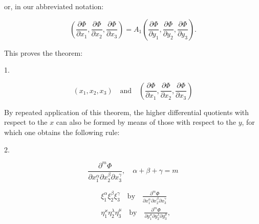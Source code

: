 or, in our abbreviated notation:

\[
\left(\frac{\partial \Phi}{\partial x_1}, \frac{\partial \Phi}{\partial x_2}, \frac{\partial \Phi}{\partial x_3}\right) = A_1 \left(\frac{\partial \Phi}{\partial y_1}, \frac{\partial \Phi}{\partial y_2}, \frac{\partial \Phi}{\partial y_3}\right).
\]

This proves the theorem:

1. 

\[
(x_1, x_2, x_3) \quad \text{and} \quad \left(\frac{\partial \Phi}{\partial x_1}, \frac{\partial \Phi}{\partial x_2}, \frac{\partial \Phi}{\partial x_3}\right)
\]


By repeated application of this theorem, the higher differential quotients with respect to the $x$ can also be formed by means of those with respect to the $y$, for which one obtains the following rule:

2. 

\[
\frac{\partial^m \Phi}{\partial x_1^\alpha \partial x_2^\beta \partial x_3^\gamma}, \quad \alpha + \beta + \gamma = m
\]




\[
\begin{aligned}
&\xi_1^\alpha \xi_2^\beta \xi_3^\gamma \quad \text{by} \quad \frac{\partial^m \Phi}{\partial x_1^\alpha \partial x_2^\beta \partial x_3^\gamma} \\
&\eta_1^\varkappa \eta_2^\lambda \eta_3^\mu \quad \text{by} \quad \frac{\partial^m \Phi}{\partial y_1^\varkappa \partial y_2^\lambda \partial y_3^\mu},
\end{aligned}
\]



